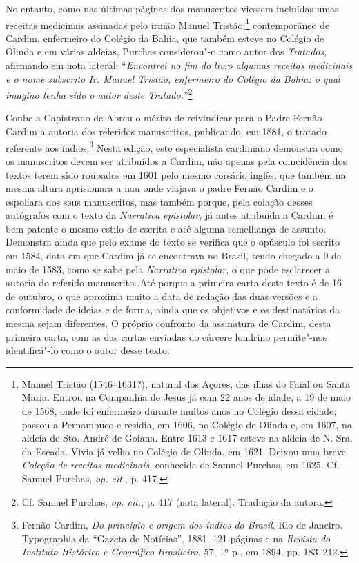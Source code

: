 No entanto, como nas últimas páginas dos manuscritos viessem
incluídas umas receitas medicinais assinadas pelo irmão Manuel
Tristão,\footnote{ Manuel Tristão (1546--1631?), natural dos Açores,
das ilhas do Faial ou Santa Maria. Entrou na Companhia de Jesus já com
22 anos de idade, a 19 de maio de 1568, onde foi enfermeiro durante
muitos anos no Colégio dessa cidade; passou a Pernambuco e residia, em
1606, no Colégio de Olinda e, em 1607, na aldeia de Sto. André de
Goiana. Entre 1613 e 1617 esteve na aldeia de N. Sra. da Escada. Vivia já
velho no Colégio de Olinda, em 1621. Deixou uma breve 
\textit{Coleção de receitas medicinais}, conhecida de Samuel Purchas, em 1625. Cf.
Samuel Purchas, \textit{op. cit.}, p. 417.} contemporâneo de Cardim,
enfermeiro do Colégio da Bahia, que também esteve no Colégio de Olinda
e em várias aldeias, Purchas considerou"-o como autor dos
\textit{Tratados}, afirmando em nota lateral: ``\textit{Encontrei 
no fim do livro algumas receitas medicinais e o nome subscrito
Ir. Manuel Tristão, enfermeiro do Colégio da Bahia: o qual imagino
tenha sido o autor deste Tratado.}''\footnote{ Cf. Samuel
Purchas, \textit{op. cit.}, p. 417 (nota lateral). Tradução da autora.}

Coube a Capistrano de Abreu o mérito de reivindicar para o
Padre Fernão Cardim a autoria dos referidos manuscritos, publicando, em
1881, o tratado referente aos índios.\footnote{ Fernão Cardim,
\textit{Do princípio e origem dos índios do Brasil}, Rio de Janeiro.
Typographia da ``Gazeta de Notícias'', 1881, 121 páginas e na
\textit{Revista do Instituto Histórico e Geográfico Brasileiro}, 57,
1ª p., em 1894, pp. 183--212.} Nesta edição, este especialista cardiniano
demonstra como os manuscritos devem ser atribuídos a Cardim, não apenas
pela coincidência dos textos terem sido roubados em 1601 pelo mesmo
corsário inglês, que também na mesma altura aprisionara a nau onde
viajava o padre Fernão Cardim e o espoliara dos seus manuscritos, mas
também porque, pela colação desses autógrafos com o texto da
\textit{Narrativa epistolar}, já antes atribuída a Cardim, é bem
patente o mesmo estilo de escrita e até alguma semelhança de assunto.
Demonstra ainda que pelo exame do texto se verifica que o opúsculo
foi escrito em 1584, data em que Cardim já se encontrava no Brasil,
tendo chegado a 9 de maio de 1583, como se sabe pela \textit{Narrativa epistolar}, 
o que pode esclarecer a autoria do referido manuscrito. Até
porque a primeira carta deste texto é de 16 de outubro, o que aproxima
muito a data de redação das duas versões e a conformidade de ideias e
de forma, ainda que os objetivos e os destinatários da mesma sejam diferentes.
O próprio confronto da assinatura de Cardim, desta primeira carta, com as das 
cartas enviadas do cárcere londrino permite"-nos identificá"-lo como o autor desse texto.   

